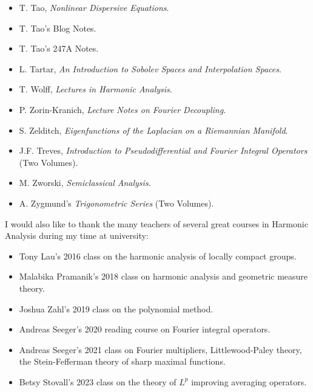 \begin{itemize}
	\item T. Tao, \emph{Nonlinear Dispersive Equations}.
	\item T. Tao's Blog Notes.
	\item T. Tao's 247A Notes.
	\item L. Tartar, \emph{An Introduction to Sobolev Spaces and Interpolation Spaces}.
	\item T. Wolff, \emph{Lectures in Harmonic Analysis}.
	\item P. Zorin-Kranich, \emph{Lecture Notes on Fourier Decoupling}.
	\item S. Zelditch, \emph{Eigenfunctions of the Laplacian on a Riemannian Manifold}.
	\item J.F. Treves, \emph{Introduction to Pseudodifferential and Fourier Integral Operators} (Two Volumes).
	\item M. Zworski, \emph{Semiclassical Analysis}.
	\item A. Zygmund's \emph{Trigonometric Series} (Two Volumes).
\end{itemize}
%
I would also like to thank the many teachers of several great courses in Harmonic Analysis during my time at university:
%
\begin{itemize}
	\item Tony Lau's 2016 class on the harmonic analysis of locally compact groups.
	\item Malabika Pramanik's 2018 class on harmonic analysis and geometric measure theory.
	\item Joshua Zahl's 2019 class on the polynomial method.
	\item Andreas Seeger's 2020 reading course on Fourier integral operators.
	\item Andreas Seeger's 2021 class on Fourier multipliers, Littlewood-Paley theory, the Stein-Fefferman theory of sharp maximal functions.
	\item Betsy Stovall's 2023 class on the theory of $L^p$ improving averaging operators.
\end{itemize}

\tableofcontents
{}



















